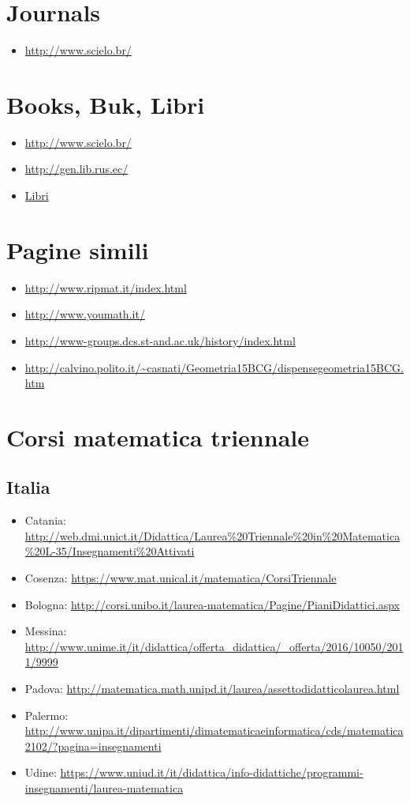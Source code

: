 \section{Journals}
\begin{itemize}
 \item \url{http://www.scielo.br/}
\end{itemize}

\section{Books, Buk, Libri}
\begin{itemize}
	\item \url{http://www.scielo.br/}
	\item \url{http://gen.lib.rus.ec/}
	\item \href{Libri.html}{Libri}
\end{itemize}

\section{Pagine simili}
\begin{itemize}
 \item \url{http://www.ripmat.it/index.html}
 \item \url{http://www.youmath.it/}
 \item \url{http://www-groups.dcs.st-and.ac.uk/history/index.html}
 \item \url{http://calvino.polito.it/~casnati/Geometria15BCG/dispensegeometria15BCG.htm}
\end{itemize}

\section{Corsi matematica triennale}
\subsection*{Italia}
\begin{itemize}
 \item Catania: \url{http://web.dmi.unict.it/Didattica/Laurea%20Triennale%20in%20Matematica%20L-35/Insegnamenti%20Attivati}
 \item Cosenza: \url{https://www.mat.unical.it/matematica/CorsiTriennale}
 \item Bologna: \url{http://corsi.unibo.it/laurea-matematica/Pagine/PianiDidattici.aspx}
 \item Messina: \url{http://www.unime.it/it/didattica/offerta_didattica/_offerta/2016/10050/2011/9999}
 \item Padova: \url{http://matematica.math.unipd.it/laurea/assettodidatticolaurea.html}
 \item Palermo: \url{http://www.unipa.it/dipartimenti/dimatematicaeinformatica/cds/matematica2102/?pagina=insegnamenti}
 \item Udine: \url{https://www.uniud.it/it/didattica/info-didattiche/programmi-insegnamenti/laurea-matematica}
\end{itemize}

